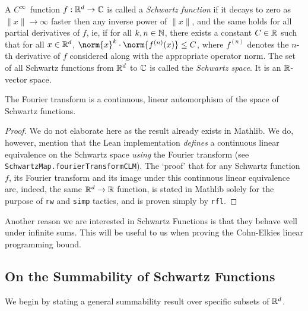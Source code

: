 \begin{definition}\label{def:Schwartz-Space}\leanok
A $C^\infty$~function $f:\mathbb{R}^d\to\mathbb{C}$ is called a \emph{Schwartz function} if it decays to zero as $\|x\|\to\infty$ faster then any inverse power of $\|x\|$, and the same holds for all partial derivatives of $f$, ie, if for all $k, n \in \mathbb{N}$, there exists a constant $C \in \mathbb{R}$ such that for all $x \in \mathbb{R}^d$, $\norm{x}^k \cdot \norm{f^{(n)}(x)} \leq C$, where $f^{(n)}$ denotes the $n$-th derivative of $f$ considered along with the appropriate operator norm. The set of all Schwartz functions from $\mathbb{R}^d$ to $\mathbb{C}$ is called the \emph{Schwartz space}. It is an $\mathbb{R}$-vector space.
\end{definition}

\begin{lemma}\label{lemma:Fourier-transform-is-automorphism}\leanok
  The Fourier transform is a continuous, linear automorphism of the space of Schwartz functions.
\end{lemma}
\begin{proof}\leanok
  We do not elaborate here as the result already exists in Mathlib. We do, however, mention that the Lean implementation \emph{defines} a continuous linear equivalence on the Schwartz space \emph{using} the Fourier transform (see \verb|SchwartzMap.fourierTransformCLM|). The `proof' that for any Schwartz function $f$, its Fourier transform and its image under this continuous linear equivalence are, indeed, the same $\mathbb{R}^d \to \mathbb{R}$ function, is stated in Mathlib solely for the purpose of \verb|rw| and \verb|simp| tactics, and is proven simply by \verb|rfl|.
\end{proof}

Another reason we are interested in Schwartz Functions is that they behave well under infinite sums. This will be useful to us when proving the Cohn-Elkies linear programming bound.

\subsection{On the Summability of Schwartz Functions}

We begin by stating a general summability result over specific subsets of $\mathbb{R}^d$.

